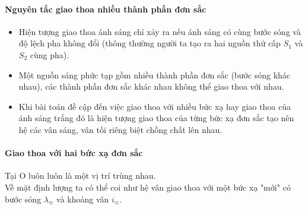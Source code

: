 \paragraph{Nguyên tắc giao thoa nhiều thành phần đơn sắc}
\begin{itemize}
\item Hiện tượng giao thoa ánh sáng chỉ xảy ra nếu ánh sáng có cùng bước sóng và độ lệch pha không đổi (thông thường người ta tạo ra hai nguồn thứ cấp $S_1$ và $S_2$ cùng pha). 
\item Một nguồn sáng phức tạp gồm nhiều thành phần đơn sắc (bước sóng khác nhau), các thành phần đơn sắc khác nhau không thể giao thoa với nhau. 
\item Khi bài toán đề cập đến việc giao thoa với nhiều bức xạ hay giao thoa của ánh sáng trắng đó là hiện tượng giao thoa của từng bức xạ đơn sắc \bth{\Rightarrow} tạo nên hệ các vân sáng, vân tối riêng biệt chồng chất lên nhau.
\end{itemize}
\paragraph{Giao thoa với hai bức xạ đơn sắc}
{Tại O luôn luôn là một vị trí trùng nhau.\\
Về mặt định lượng ta có thể coi như hệ vân giao thoa với một bức xạ "mới" có bước sóng $\lambda_{\equiv}$ và khoảng vân $i_{\equiv}$.
}